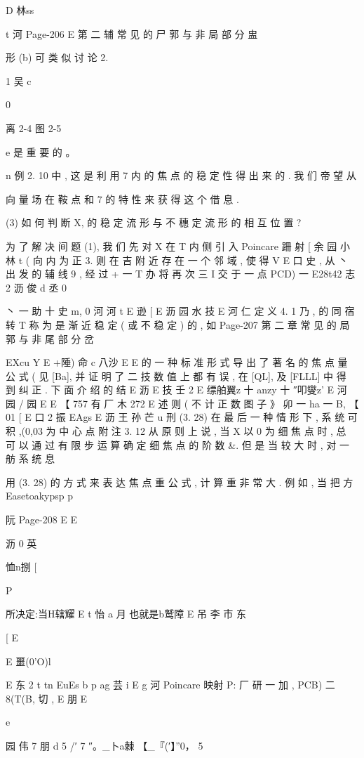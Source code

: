 {{{{{{{{{{{{D 林ss

t 河
Page-206
E 第 二 辅 常 见 的 尸 郭 与 非 局 部 分 盅

形 (b) 可 类 似 讨 论 2.

1 吴 c

0

离 2-4 图 2-5

e
是 重 要 的 。

n
例 2. 10 中 , 这 是 利 用 7 内 的 焦 点 的 稳 定 性 得 出 来 的 . 我 们 帝 望 从

向 量 场 在 鞍 点 和 7 的 特 性 来 获 得 这 个 借 息 .

(3) 如 何 判 断 X, 的 稳 定 流 形 与 不 穗 定 流 形 的 相 互 位 置 ?

为 了 解 决 间 题 (1), 我 们 先 对 X 在 T 内 侧 引 入 Poincare 跚 射
[ 余 园 小 林 t
( 向 内 为 正 3. 则 在 吉 附 近 存 在 一 个 邻 域 , 使 得 V E 口 史 , 从
丶 出 发 的 辅 线 9 , 经 过 + 一 T 办 将 再 次 三 I 交 于 一 点 PCD) 一
E28t42 志 2 沥 俊 d 丞
0

丶 一 助 十 史 m, 0 河
河 t
E 逊 [
E 沥 园 水 技
E 河 仁
定 义 4. 1 乃 , 的 同 宿 转 T 称 为 是 渐 近 稳 定 ( 或 不 稳 定 ) 的 , 如
Page-207
第 二 章 常 见 的 局 郭 与 非 尾 部 分 岔

EXcu Y
E +陲) 命
c 八沙
E
E
的 一 种 标 准 形 式 导 出 了 著 名 的 焦 点 量 公 式 ( 见 [Ba], 并 证 明 了 二
技
数 值 上 都 有 误 , 在 [QL], 及 [FLLL] 中 得 到 纠 正 . 下 面 介 绍 的 结
E 沥
E 技
壬 2 E 缥舶翼z 十 anzy 十 ″叩燮z'
E 河 园 / 园
E
E
【 757 有 厂 木 272
E 述
则 ( 不 计 正 数 图 子 》
卯 一 ha 一 B,
【 01
[ E 口 2 振 EAgs
E 沥 王 孙 芒 u 刑
(3. 28)
在 最 后 一 种 情 形 下 , 系 统 可 积 ,(0,03 为 中 心 点
附 注 3. 12 从 原 则 上 说 , 当 X 以 0 为 细 焦 点 时 , 总 可 以 通 过
有 限 步 运 算 确 定 细 焦 点 的 阶 数 &. 但 是 当 较 大 时 , 对 一 舫 系 统 息

用 (3. 28) 的 方 式 来 表 达 焦 点 重 公 式 , 计 算 重 非 常 大 . 例 如 , 当 把 方
Easetoakypsp p

阮
Page-208
E E

沥
0 英

恤n捌 [

P

所决定:当H辖耀 E t 怡 a 月 也就是b鹫障 E 吊 李 市 东

[
E

E 噩(0'O)l

E 东 2 t tn
EuEs b p ag 芸 i
E g 河
Poincare 映射
P: 厂 研 一 加 , PCB) 二 8(T(B, 切 ,
E 朋
E

e

园 伟 7 朋 d 5
/′ 7 ″。_卜a棘 【_『(′】”0， 5

}}}}}}}}}}}}
